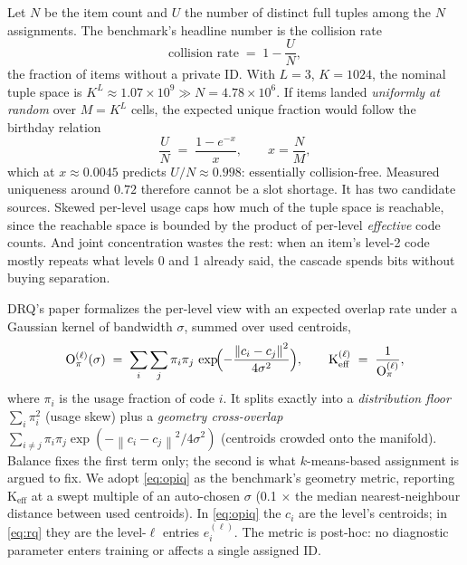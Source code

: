 \documentclass[11pt]{article}
\newcommand{\norm}[1]{\left\lVert #1 \right\rVert}
\newcommand{\Opi}{\mathrm{O}_\pi}
\newcommand{\Keff}{\mathrm{K}_{\mathrm{eff}}}
\begin{document}
Let $N$ be the item count and $U$ the number of distinct full tuples among the
$N$ assignments. The benchmark's headline number is the collision rate
\begin{equation}
  \text{collision rate} \;=\; 1 - \frac{U}{N},
  \label{eq:collision}
\end{equation}
the fraction of items without a private ID. With $L = 3$, $K = 1024$, the
nominal tuple space is $K^L \approx 1.07 \times 10^9 \gg N = 4.78 \times 10^6$.
If items landed \emph{uniformly at random} over $M = K^L$ cells, the expected
unique fraction would follow the birthday relation
\begin{equation}
  \frac{U}{N} \;=\; \frac{1 - e^{-x}}{x}, \qquad x = \frac{N}{M},
  \label{eq:birthday}
\end{equation}
which at $x \approx 0.0045$ predicts $U/N \approx 0.998$: essentially
collision-free. Measured uniqueness around $0.72$ therefore cannot be a slot
shortage. It has two candidate sources. Skewed per-level usage caps how much of
the tuple space is reachable, since the reachable space is bounded by the
product of per-level \emph{effective} code counts. And joint concentration
wastes the rest: when an item's level-2 code mostly repeats what levels 0 and 1
already said, the cascade spends bits without buying separation.

DRQ's paper formalizes the per-level view with an expected overlap rate under a
Gaussian kernel of bandwidth $\sigma$, summed over used centroids,
\begin{equation}
  \Opi^{(\ell)}(\sigma) \;=\; \sum_{i}\sum_{j} \pi_i \pi_j\,
    \exp\!\Bigl(-\frac{\norm{c_i - c_j}^2}{4\sigma^2}\Bigr),
  \qquad
  \Keff^{(\ell)} \;=\; \frac{1}{\Opi^{(\ell)}},
  \label{eq:opiq}
\end{equation}
where $\pi_i$ is the usage fraction of code $i$. It splits exactly into a
\emph{distribution floor} $\sum_i \pi_i^2$ (usage skew) plus a \emph{geometry
cross-overlap} $\sum_{i \neq j} \pi_i \pi_j \exp(-\norm{c_i - c_j}^2 / 4\sigma^2)$
(centroids crowded onto the manifold). Balance fixes the first term only; the
second is what $k$-means-based assignment is argued to fix. We adopt
\eqref{eq:opiq} as the benchmark's geometry metric, reporting
$\Keff$ at a swept multiple of an auto-chosen $\sigma$ (0.1 $\times$ the median
nearest-neighbour distance between used centroids). In
\eqref{eq:opiq} the $c_i$ are the level's centroids; in \eqref{eq:rq} they are
the level-$\ell$ entries $e^{(\ell)}_i$. The metric is post-hoc: no diagnostic
parameter enters training or affects a single assigned ID.
\end{document}
